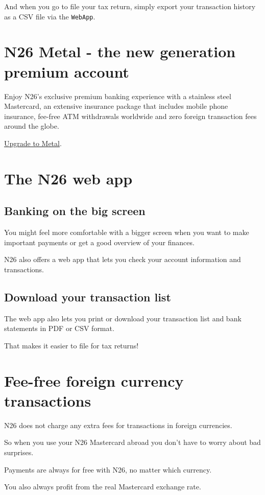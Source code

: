 \documentclass[onsided]{book}
\numberwithin{equation}{section}
\begin{document}
And when you go to file your tax return, simply export your transaction history as a CSV file via the \texttt{WebApp}.

\section{N26 Metal - the new generation premium account}
Enjoy N26's exclusive premium banking experience with a stainless steel Mastercard, an extensive insurance package that includes mobile phone insurance, fee-free ATM withdrawals worldwide and zero foreign transaction fees around the globe.

\href{https://get.n26.com/?_ga=2.185272041.1189510936.1611884241-1079622474.1611780638}{Upgrade to Metal}.

\section{The N26 web app}

\subsection{Banking on the big screen}
You might feel more comfortable with a bigger screen when you want to make important payments or get a good overview of your finances.

N26 also offers a web app that lets you check your account information and transactions.

\subsection{Download your transaction list}
The web app also lets you print or download your transaction list and bank statements in PDF or CSV format.

That makes it easier to file for tax returns!

\section{Fee-free foreign currency transactions}
N26 does not charge any extra fees for transactions in foreign currencies.

So when you use your N26 Mastercard abroad you don't have to worry about bad surprises.

Payments are always for free with N26, no matter which currency.

You also always profit from the real Mastercard exchange rate.
\end{document}

